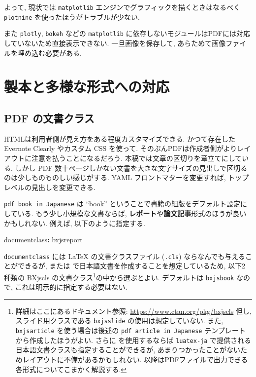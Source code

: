 \documentclass[
  xelatex,ja=standard,jafont=noto]{bxjsbook}
\newenvironment{Shaded}{\begin{snugshade}}{\end{snugshade}}
\newcommand{\AttributeTok}[1]{\textcolor[rgb]{0.77,0.63,0.00}{#1}}
\newcommand{\FunctionTok}[1]{\textcolor[rgb]{0.00,0.00,0.00}{#1}}
\newcommand{\KeywordTok}[1]{\textcolor[rgb]{0.13,0.29,0.53}{\textbf{#1}}}
\theoremstyle{definition}
\theoremstyle{definition}
\theoremstyle{definition}
\theoremstyle{definition}
\theoremstyle{remark}
\begin{document}
よって, 現状では \texttt{matplotlib}
エンジンでグラフィックを描くときはなるべく \texttt{plotnine}
を使ったほうがトラブルが少ない.

また \texttt{plotly}, \texttt{bokeh} などの \texttt{matplotlib}
に依存しないモジュールはPDFには対応していないため直接表示できない.
一旦画像を保存して, あらためて画像ファイルを埋め込む必要がある.

\hypertarget{part-ux88fdux672cux3068ux591aux69d8ux306aux5f62ux5f0fux3078ux306eux5bfeux5fdc}{%
\part{
製本と多様な形式への対応}\label{part-ux88fdux672cux3068ux591aux69d8ux306aux5f62ux5f0fux3078ux306eux5bfeux5fdc}}

\hypertarget{pdf-ux306eux6587ux66f8ux30afux30e9ux30b9}{%
\chapter{PDF
の文書クラス}\label{pdf-ux306eux6587ux66f8ux30afux30e9ux30b9}}

HTMLは利用者側が見え方をある程度カスタマイズできる. かつて存在した
Evernote Clearly やカスタム CSS を使って.
そのぶんPDFは作成者側がよりレイアウトに注意を払うことになるだろう.
本稿では文章の区切りを章立てにしている. しかし PDF
数十ページしかない文書を大きな文字サイズの見出しで区切るのは少しものものしい感じがする.
YAML フロントマターを変更すれば, トップレベルの見出しを変更できる.

\texttt{pdf\ book\ in\ Japanese} は ``book''
ということで書籍の組版をデフォルト設定にしている.
もう少し小規模な文書ならば,
\textbf{レポート}や\textbf{論文記事}形式のほうが良いかもしれない.
例えば, 以下のように指定する.

\begin{Shaded}
\begin{Highlighting}[]
\FunctionTok{documentclass}\KeywordTok{:}\AttributeTok{ bxjsreport}
\end{Highlighting}
\end{Shaded}

\texttt{documentclass} には LaTeX の文書クラスファイル (\texttt{.cls})
ならなんでも与えることができるが, \XeLaTeX または
\LuaLaTeX で日本語文書を作成することを想定しているため, 以下2種類の
BXjscls の文書クラス\footnote{詳細はここにあるドキュメント参照:
  \url{https://www.ctan.org/pkg/bxjscls} 但し, スライド用クラスである
  \texttt{bxjsslide} の使用は想定していない. また, \texttt{bxjsarticle}
  を使う場合は後述の \texttt{pdf\ article\ in\ Japanese}
  テンプレートから作成したほうがよい. さらに \LuaLaTeX を使用するならば
  \texttt{luatex-ja}
  で提供される日本語文書クラスも指定することができるが,
  あまりつかったことがないためレイアウトに不備があるかもしれない.
  以降はPDFファイルで出力できる各形式についてこまかく解説する.}の中から選ぶとよい.
デフォルトは \texttt{bxjsbook} なので, これは明示的に指定する必要はない.
\end{document}
